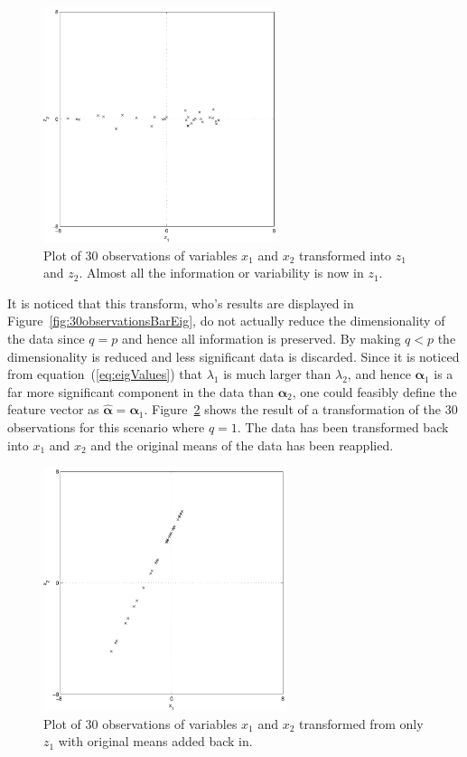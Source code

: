 \begin{figure}[!]
  \begin{center}
    \includegraphics[width=260px]{30observationsBarTrans.pdf}
    \caption{Plot of 30 observations of variables $x_1$ and $x_2$ transformed into $z_1$ and $z_2$. Almost all the information or variability is now in $z_1$.}\label{fig:30observationsBarTrans}
  \end{center}
\end{figure}

It is noticed that this transform, who's results are displayed in Figure~\ref{fig:30observationsBarEig}, do not actually reduce the dimensionality of the data since $q=p$ and hence all information is preserved. By making $q<p$ the dimensionality is reduced and less significant data is discarded. Since it is noticed from equation~(\ref{eq:eigValues}) that $\lambda_1$ is much larger than $\lambda_2$, and hence $\boldsymbol\alpha_1$ is a far more significant component in the data than $\boldsymbol\alpha_2$, one could feasibly define the feature vector as $\hat{\boldsymbol\alpha} = \boldsymbol\alpha_1$. Figure~\ref{fig:30observationsFinal} shows the result of a transformation of the 30 observations for this scenario where $q=1$. The data has been transformed back into $x_1$ and $x_2$ and the original means of the data has been reapplied.

\begin{figure}[!]
  \begin{center}
    \includegraphics[width=270px]{30observationsFinal.pdf}
    \caption{Plot of 30 observations of variables $x_1$ and $x_2$ transformed from only $z_1$ with original means added back in.}\label{fig:30observationsFinal}
  \end{center}
\end{figure}

